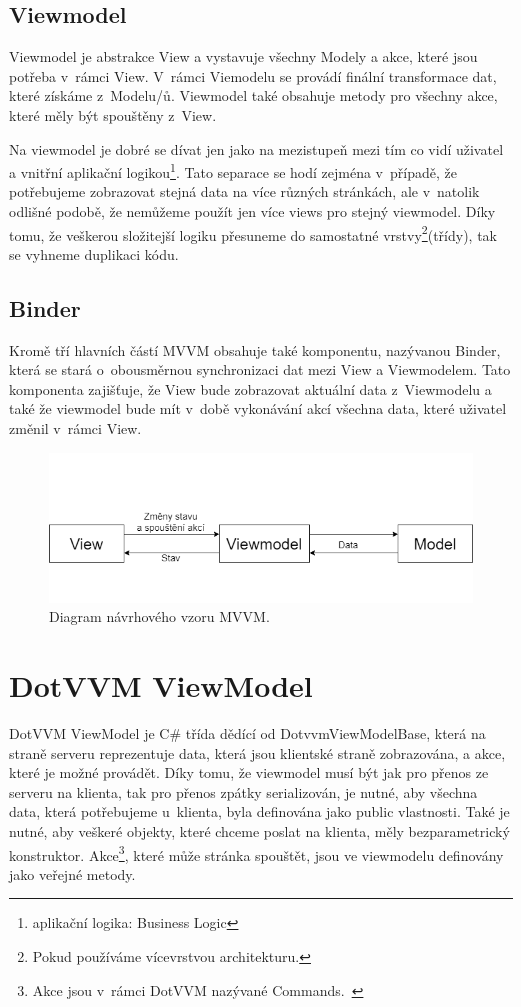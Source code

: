 \subsection*{Viewmodel}
Viewmodel je abstrakce View a vystavuje všechny Modely a akce, které jsou potřeba v~rámci View. V~rámci Viemodelu se provádí finální transformace dat, které získáme z~Modelu/ů. Viewmodel také obsahuje metody pro všechny akce, které měly být spouštěny z~View.

Na viewmodel je dobré se dívat jen jako na mezistupeň mezi tím co vidí uživatel a vnitřní aplikační logikou\footnote{aplikační logika: Business Logic}. Tato separace se hodí zejména v~případě, že potřebujeme zobrazovat stejná data na více různých stránkách, ale v~natolik odlišné podobě, že nemůžeme použít jen více views pro stejný viewmodel. Díky tomu, že veškerou složitejší logiku přesuneme do samostatné vrstvy\footnote{Pokud používáme vícevrstvou architekturu.}(třídy), tak se vyhneme duplikaci kódu.
\subsection*{Binder}
Kromě tří hlavních částí MVVM obsahuje také komponentu, nazývanou Binder, která se stará o~obousměrnou synchronizaci dat mezi View a Viewmodelem. Tato komponenta zajišťuje, že View bude zobrazovat aktuální data z~Viewmodelu a také že viewmodel bude mít v~době vykonávání akcí všechna data, které uživatel změnil v~rámci View.
\begin{figure}[!h]
	\centering
	\includegraphics[width=1\textwidth]{obrazky-figures/MVVM.png}
	\caption{Diagram návrhového vzoru MVVM.}
	\label{MVVM DIAGRAM}
\end{figure}
\section{DotVVM ViewModel}

DotVVM ViewModel je C\# třída dědící od DotvvmViewModelBase, která na straně serveru reprezentuje data, která jsou klientské straně zobrazována, a akce, které je možné provádět.
Díky tomu, že viewmodel musí být jak pro přenos ze serveru na klienta, tak pro přenos zpátky serializován, je nutné, aby všechna data, která potřebujeme u~klienta, byla definována jako public vlastnosti. Také je nutné, aby veškeré objekty, které chceme poslat na klienta, měly bezparametrický konstruktor.
Akce\footnote{Akce jsou v~rámci DotVVM nazývané Commands.~\cite{DotVVM-VM}}, které může stránka spouštět, jsou ve viewmodelu definovány jako veřejné metody.

